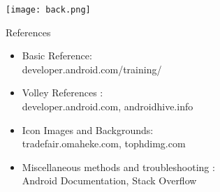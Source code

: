 \documentclass{beamer}
\begin{document}
{\usebackgroundtemplate%
{\texttt{[image: back.png]}}

\begin{frame}{References}
    
    \begin{itemize}
        \item {Basic Reference:\\developer.android.com/training/}
        \item {Volley References :\\ developer.android.com, androidhive.info}
        \item {Icon Images and Backgrounds:\\ tradefair.omaheke.com, tophdimg.com }
        \item {Miscellaneous methods and troubleshooting :\\ Android Documentation, Stack Overflow}
    \end{itemize}
    
\end{frame}
}
\end{document}
